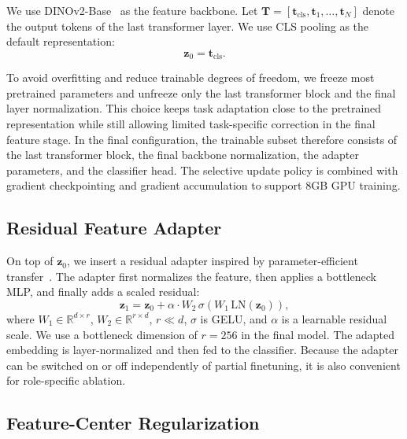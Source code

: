 \documentclass[a4paper,fleqn]{cas-sc}
\begin{document}
We use DINOv2-Base~\cite{oquab2023dinov2} as the feature backbone. Let $\mathbf{T} = [\mathbf{t}_{\text{cls}}, \mathbf{t}_1, \dots, \mathbf{t}_N]$ denote the output tokens of the last transformer layer. We use CLS pooling as the default representation:
\begin{equation}
\mathbf{z}_0 = \mathbf{t}_{\text{cls}}.
\end{equation}

To avoid overfitting and reduce trainable degrees of freedom, we freeze most pretrained parameters and unfreeze only the last transformer block and the final layer normalization. This choice keeps task adaptation close to the pretrained representation while still allowing limited task-specific correction in the final feature stage. In the final configuration, the trainable subset therefore consists of the last transformer block, the final backbone normalization, the adapter parameters, and the classifier head. The selective update policy is combined with gradient checkpointing and gradient accumulation to support 8GB GPU training.

\subsection{Residual Feature Adapter}

On top of $\mathbf{z}_0$, we insert a residual adapter inspired by parameter-efficient transfer~\cite{houlsby2019adapter}. The adapter first normalizes the feature, then applies a bottleneck MLP, and finally adds a scaled residual:
\begin{equation}
\mathbf{z}_1 = \mathbf{z}_0 + \alpha \cdot W_2 \, \sigma \left(W_1 \, \text{LN}(\mathbf{z}_0)\right),
\end{equation}
where $W_1 \in \mathbb{R}^{d \times r}$, $W_2 \in \mathbb{R}^{r \times d}$, $r \ll d$, $\sigma$ is GELU, and $\alpha$ is a learnable residual scale. We use a bottleneck dimension of $r=256$ in the final model. The adapted embedding is layer-normalized and then fed to the classifier. Because the adapter can be switched on or off independently of partial finetuning, it is also convenient for role-specific ablation.

\subsection{Feature-Center Regularization}
\end{document}
